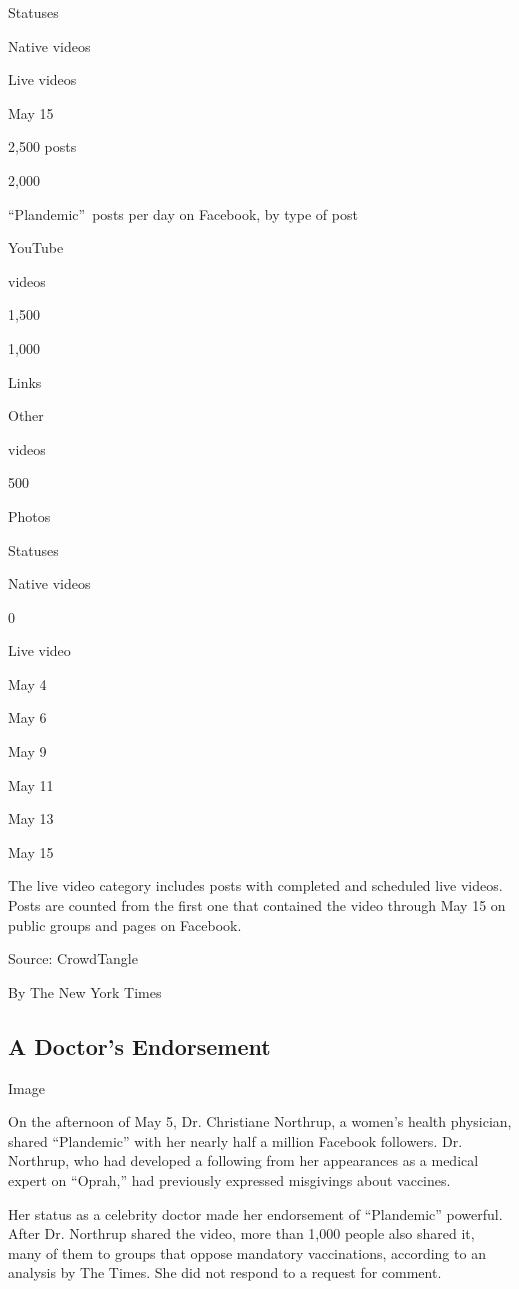 Statuses

Native videos

Live videos

May 15

2,500 posts

2,000

``Plandemic''~posts per day on Facebook, by type of post

YouTube

videos

1,500

1,000

Links

Other

videos

500

Photos

Statuses

Native videos

0

Live video

May 4

May 6

May 9

May 11

May 13

May 15

The live video category includes posts with completed and scheduled live
videos. Posts are counted from the first one that contained the video
through May 15 on public groups and pages on Facebook.

Source: CrowdTangle

By The New York Times

\hypertarget{a-doctors-endorsement}{%
\subsection{A Doctor's Endorsement}\label{a-doctors-endorsement}}

Image

On the afternoon of May 5, Dr. Christiane Northrup, a women's health
physician, shared ``Plandemic'' with her nearly half a million Facebook
followers. Dr. Northrup, who had developed a following from her
appearances as a medical expert on ``Oprah,'' had previously expressed
misgivings about vaccines.

Her status as a celebrity doctor made her endorsement of ``Plandemic''
powerful. After Dr. Northrup shared the video, more than 1,000 people
also shared it, many of them to groups that oppose mandatory
vaccinations, according to an analysis by The Times. She did not respond
to a request for comment.

